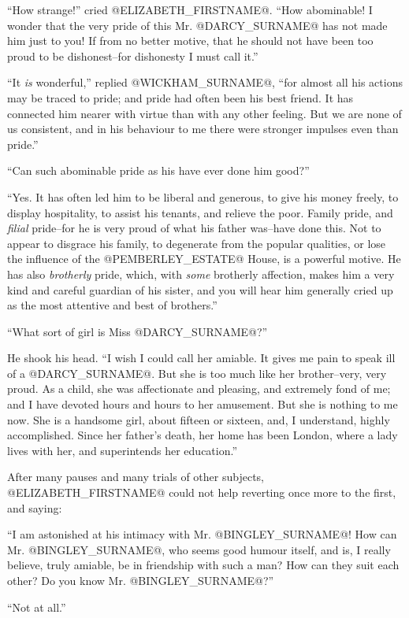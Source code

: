 ``How strange!'' cried @ELIZABETH_FIRSTNAME@. ``How abominable! I wonder that the very
pride of this Mr. @DARCY_SURNAME@ has not made him just to you! If from no better
motive, that he should not have been too proud to be dishonest--for
dishonesty I must call it.''

``It \textit{is} wonderful,'' replied @WICKHAM_SURNAME@, ``for almost all his actions may
be traced to pride; and pride had often been his best friend. It has
connected him nearer with virtue than with any other feeling. But we are
none of us consistent, and in his behaviour to me there were stronger
impulses even than pride.''

``Can such abominable pride as his have ever done him good?''

``Yes. It has often led him to be liberal and generous, to give his money
freely, to display hospitality, to assist his tenants, and relieve the
poor. Family pride, and \textit{filial} pride--for he is very proud of what
his father was--have done this. Not to appear to disgrace his family,
to degenerate from the popular qualities, or lose the influence of the
@PEMBERLEY_ESTATE@ House, is a powerful motive. He has also \textit{brotherly} pride,
which, with \textit{some} brotherly affection, makes him a very kind and
careful guardian of his sister, and you will hear him generally cried up
as the most attentive and best of brothers.''

``What sort of girl is Miss @DARCY_SURNAME@?''

He shook his head. ``I wish I could call her amiable. It gives me pain to
speak ill of a @DARCY_SURNAME@. But she is too much like her brother--very, very
proud. As a child, she was affectionate and pleasing, and extremely fond
of me; and I have devoted hours and hours to her amusement. But she is
nothing to me now. She is a handsome girl, about fifteen or sixteen,
and, I understand, highly accomplished. Since her father's death, her
home has been London, where a lady lives with her, and superintends her
education.''

After many pauses and many trials of other subjects, @ELIZABETH_FIRSTNAME@ could not
help reverting once more to the first, and saying:

``I am astonished at his intimacy with Mr. @BINGLEY_SURNAME@! How can Mr. @BINGLEY_SURNAME@,
who seems good humour itself, and is, I really believe, truly amiable,
be in friendship with such a man? How can they suit each other? Do you
know Mr. @BINGLEY_SURNAME@?''

``Not at all.''

